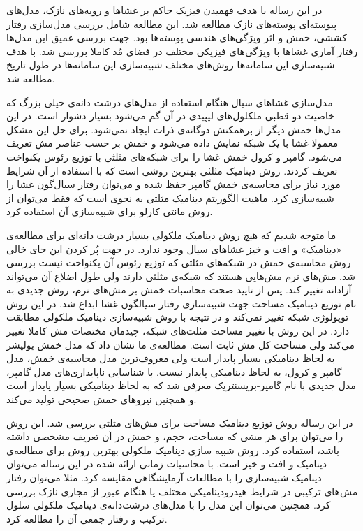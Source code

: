 \setRL
\clearpage
در این رساله با هدف فهمیدن فیزیک حاکم بر غشا‌ها و رویه‌های نازک، مدل‌های پیوسته‌ای پوسته‌های نازک مطالعه شد. این مطالعه شامل بررسی مدل‌سازی رفتار کششی، خمش و اثر ویژگی‌های هندسی پوسته‌ها بود. جهت بررسی عمیق این مدل‌ها رفتار آماری غشا‌ها با ویژگی‌های فیزیکی مختلف در فضای مُد کاملا بررسی شد. با هدف شبیه‌سازی این سامانه‌ها روش‌های مختلف شبیه‌سازی این سامانه‌ها در طول تاریخ مطالعه شد.

 مدل‌سازی غشا‌های سیال هنگام استفاده از مدل‌های درشت دانه‌ی خیلی بزرگ که خاصیت دو قطبی ملکلول‌های لیپیدی در آن گم می‌شود بسیار دشوار است. در این مدل‌ها خمش دیگر از برهمکنش دوگانه‌ی ذرات ایجاد نمی‌شود. برای حل این مشکل معمولا غشا با یک شبکه‌ نمایش داده می‌شود و خمش بر حسب عناصر مش تعریف می‌شود. گامپر و کرول خمش غشا را برای شبکه‌های مثلثی با توزیع رئوس یکنواخت تعریف کردند. روش دینامیک مثلثی بهترین روشی است که با استفاده از آن شرایط مورد نیاز برای محاسبه‌ی خمش گامپر حفظ شده و می‌توان رفتار سیال‌گون غشا را شبیه‌سازی کرد. ماهیت الگوریتم دینامیک مثلثی به نحوی است که فقط می‌توان از روش مانتی کارلو برای شبیه‌سازی آن استفاده کرد. 
 
ما متوجه شدیم که  هیچ روش دینامیک ملکولی بسیار درشت دانه‌ای برای مطالعه‌ی «دینامیک» و افت و خیز غشا‌های سیال وجود ندارد. در جهت پُر کردن این جای خالی روش محاسبه‌ی خمش در شبکه‌های مثلثی که توزیع رئوس آن یکنواخت نیست بررسی شد. مش‌های نرم مش‌هایی هستند که شبکه‌ی مثلثی دارند ولی طول اضلاع آن می‌تواند آزادانه تغییر کند. پس از تایید صحت محاسبات خمش بر مش‌های نرم، روش جدیدی به نام توزیع دینامیک مساحت جهت شبیه‌سازی رفتار سیالگون غشا ابداع شد. در این روش توپولوژی شبکه تغییر نمی‌کند و در نتیجه با روش شبیه‌سازی دینامیک ملکولی مطابقت دارد. در این روش با تغییر مساحت مثلث‌های شبکه، چیدمان مختصات مش کاملا تغییر می‌کند ولی مساحت کل مش  ثابت است. مطالعه‌ی ما نشان داد که مدل خمش یولیشر به لحاظ دینامیکی بسیار پایدار است ولی معروف‌ترین مدل محاسبه‌ی خمش، مدل گامپر و کرول، به لحاظ دینامیکی پایدار نیست. با شناسایی ناپایداری‌های مدل گامپر، مدل جدیدی با نام گامپر-بریسنتریک معرفی شد که به لحاظ دینامیکی بسیار پایدار است و همچنین نیروهای خمش صحیحی تولید می‌کند.

در این رساله روش توزیع دینامیک مساحت برای مش‌های مثلثی بررسی شد. این روش را می‌توان برای هر مشی که مساحت، حجم، و خمش در آن تعریف مشخصی داشته باشد، استفاده کرد. روش شبیه سازی دینامیک ملکولی بهترین روش برای مطالعه‌ی دینامیک و افت و خیز است. با محاسبات زمانی ارائه شده در این رساله می‌توان دینامیک شبیه‌سازی را با مطالعات آزمایشگاهی مقایسه کرد. مثلا می‌توان رفتار مش‌های ترکیبی در شرایط هیدرودینامیکی مختلف یا هنگام عبور از مجاری نازک بررسی کرد. همچنین می‌توان این مدل را با مدل‌های درشت‌دانه‌ی دینامیک ملکولی سلول ترکیب و رفتار جمعی آن را مطالعه کرد.

